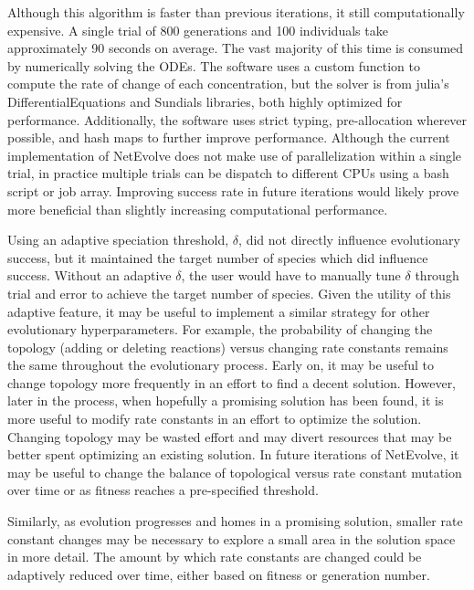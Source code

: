 \documentclass[12pt]{report}
\begin{document}
Although this algorithm is faster than previous iterations, it still computationally expensive. A single trial of 800 generations and 100 individuals take approximately 90 seconds on average. The vast majority of this time is consumed by numerically solving the ODEs. The software uses a custom function to compute the rate of change of each concentration, but the solver is from julia's DifferentialEquations and Sundials libraries, both highly optimized for performance. Additionally, the software uses strict typing, pre-allocation wherever possible, and hash maps to further improve performance. Although the current implementation of NetEvolve does not make use of parallelization within a single trial, in practice multiple trials can be dispatch to different CPUs using a bash script or job array. Improving success rate in future iterations would likely prove more beneficial than slightly increasing computational performance.


Using an adaptive speciation threshold, $\delta$, did not directly influence evolutionary success, but it maintained the target number of species which did influence success. Without an adaptive $\delta$, the user would have to manually tune $\delta$ through trial and error to achieve the target number of species. Given the utility of this adaptive feature, it may be useful to implement a similar strategy for other evolutionary hyperparameters. For example, the probability of changing the topology (adding or deleting reactions) versus changing rate constants remains the same throughout the evolutionary process. Early on, it may be useful to change topology more frequently in an effort to find a decent solution. However, later in the process, when hopefully a promising solution has been found, it is more useful to modify rate constants in an effort to optimize the solution. Changing topology may be wasted effort and may divert resources that may be better spent optimizing an existing solution. In future iterations of NetEvolve, it may be useful to change the balance of topological versus rate constant mutation over time or as fitness reaches a pre-specified threshold.

Similarly, as evolution progresses and homes in a promising solution, smaller rate constant changes may be necessary to explore a small area in the solution space in more detail. The amount by which rate constants are changed could be adaptively reduced over time, either based on fitness or generation number. 
\end{document}
